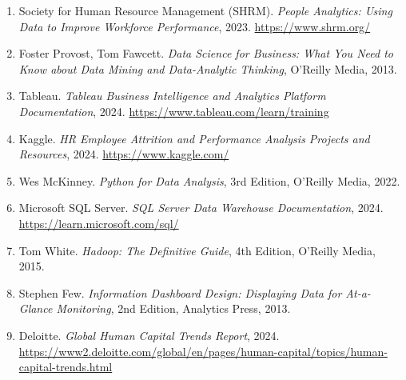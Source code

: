 \begin{enumerate}
    \item Society for Human Resource Management (SHRM). 
    \textit{People Analytics: Using Data to Improve Workforce Performance}, 2023. 
    \url{https://www.shrm.org/}

    \item Foster Provost, Tom Fawcett. 
    \textit{Data Science for Business: What You Need to Know about Data Mining and Data-Analytic Thinking}, O’Reilly Media, 2013.

    \item Tableau. \textit{Tableau Business Intelligence and Analytics Platform Documentation}, 2024. 
    \url{https://www.tableau.com/learn/training}

    \item Kaggle. \textit{HR Employee Attrition and Performance Analysis Projects and Resources}, 2024. 
    \url{https://www.kaggle.com/}

    \item Wes McKinney. \textit{Python for Data Analysis}, 3rd Edition, O’Reilly Media, 2022.

    \item Microsoft SQL Server. \textit{SQL Server Data Warehouse Documentation}, 2024. 
    \url{https://learn.microsoft.com/sql/}

    \item Tom White. \textit{Hadoop: The Definitive Guide}, 4th Edition, O’Reilly Media, 2015.

    \item Stephen Few. \textit{Information Dashboard Design: Displaying Data for At-a-Glance Monitoring}, 2nd Edition, Analytics Press, 2013.

    \item Deloitte. \textit{Global Human Capital Trends Report}, 2024. 
    \url{https://www2.deloitte.com/global/en/pages/human-capital/topics/human-capital-trends.html}

\end{enumerate}